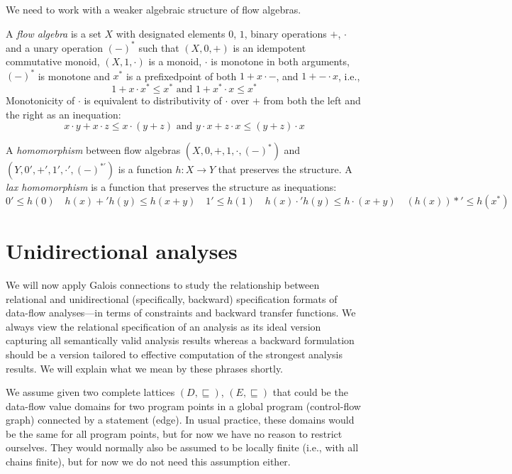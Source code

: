 \documentclass{llncs}
\newcommand{\sqleq}{\sqsubseteq}
\begin{document}
We need to work with a weaker algebraic structure of flow algebras. 

A \emph{flow algebra} is a set $X$ with designated elements $0$, $1$,
binary operations $+$, $\cdot$ and a unary operation $(-)^*$ such that
$(X, 0, {+})$ is an idempotent commutative monoid, $(X, 1, {\cdot})$
is a monoid, $\cdot$ is monotone in both arguments, $(-)^*$ is
monotone and $x^*$ is a prefixedpoint of both $1 + x \cdot {-}$, and
$1 + {-} \cdot x$, i.e.,
\[
  1 + x \cdot x^* \leq x^* \textrm{~and~} 1 + x^* \cdot x \leq x^*  
\]  
Monotonicity of $\cdot$ is equivalent to distributivity of $\cdot$
over $+$ from both the left and the right as an inequation:
\[
  x \cdot y + x \cdot z \leq x \cdot (y+z) \textrm{~and~}
  y \cdot x + z \cdot x \leq (y+z) \cdot x  
\]

A \emph{homomorphism} between flow algebras
$(X, 0, {+}, 1, {\cdot}, (-)^*)$ and
$(Y, 0', {+'}, 1', {\cdot'}, (-)^{*'})$ is a function $h : X \to Y$
that preserves the structure. A \emph{lax homomorphism} is a function
that preserves the structure as inequations:
\[
  0' \leq h(0) \quad h(x) +' h(y) \leq h(x + y) \quad
  1' \leq h(1) \quad h(x) \cdot' h(y) \leq h \cdot (x + y) \quad
  (h(x))*' \leq h(x^*) 
\]  

\section{Unidirectional analyses}

We will now apply Galois connections to study the relationship between
relational and unidirectional (specifically, backward) specification
formats of data-flow analyses---in terms of constraints and backward
transfer functions. We always view the relational specification of an
analysis as its ideal version capturing all semantically valid
analysis results whereas a backward formulation should be a version
tailored to effective computation of the strongest analysis
results. We will explain what we mean by these phrases shortly.

We assume given two complete lattices $(D, \sqleq)$, $(E, \sqleq)$
that could be the data-flow value domains for two program points in a
global program (control-flow graph) connected by a statement
(edge). In usual practice, these domains would be the same for all
program points, but for now we have no reason to restrict
ourselves. They would normally also be assumed to be locally finite
(i.e., with all chains finite), but for now we do not need this
assumption either.
\end{document}
